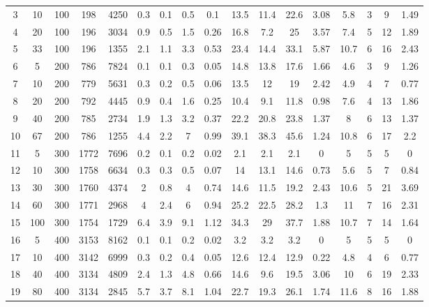 \documentclass[11pt]{article}
\begin{document}
\begin{appendices}
\begin{landscape}
\begin{longtable}[c]{ccccc|cccc|cccc|cccc}
				3 & 10 & 100 & 198 & 4250 & 0.3 & 0.1 & 0.5 & 0.1 & 13.5 & 11.4 & 22.6 & 3.08 & 5.8 & 3 & 9 & 1.49 \\
				\rowcolor[HTML]{EFEFEF} 
				4 & 20 & 100 & 196 & 3034 & 0.9 & 0.5 & 1.5 & 0.26 & 16.8 & 7.2 & 25 & 3.57 & 7.4 & 5 & 12 & 1.89 \\
				\rowcolor[HTML]{EFEFEF} 
				5 & 33 & 100 & 196 & 1355 & 2.1 & 1.1 & 3.3 & 0.53 & 23.4 & 14.4 & 33.1 & 5.87 & 10.7 & 6 & 16 & 2.43 \\
				6 & 5 & 200 & 786 & 7824 & 0.1 & 0.1 & 0.3 & 0.05 & 14.8 & 13.8 & 17.6 & 1.66 & 4.6 & 3 & 9 & 1.26 \\
				7 & 10 & 200 & 779 & 5631 & 0.3 & 0.2 & 0.5 & 0.06 & 13.5 & 12 & 19 & 2.42 & 4.9 & 4 & 7 & 0.77 \\
				8 & 20 & 200 & 792 & 4445 & 0.9 & 0.4 & 1.6 & 0.25 & 10.4 & 9.1 & 11.8 & 0.98 & 7.6 & 4 & 13 & 1.86 \\
				9 & 40 & 200 & 785 & 2734 & 1.9 & 1.3 & 3.2 & 0.37 & 22.2 & 20.8 & 23.8 & 1.37 & 8 & 6 & 13 & 1.37 \\
				10 & 67 & 200 & 786 & 1255 & 4.4 & 2.2 & 7 & 0.99 & 39.1 & 38.3 & 45.6 & 1.24 & 10.8 & 6 & 17 & 2.2 \\
				\rowcolor[HTML]{EFEFEF} 
				11 & 5 & 300 & 1772 & 7696 & 0.2 & 0.1 & 0.2 & 0.02 & 2.1 & 2.1 & 2.1 & 0 & 5 & 5 & 5 & 0 \\
				\rowcolor[HTML]{EFEFEF} 
				12 & 10 & 300 & 1758 & 6634 & 0.3 & 0.3 & 0.5 & 0.07 & 14 & 13.1 & 14.6 & 0.73 & 5.6 & 5 & 7 & 0.84 \\
				\rowcolor[HTML]{EFEFEF} 
				13 & 30 & 300 & 1760 & 4374 & 2 & 0.8 & 4 & 0.74 & 14.6 & 11.5 & 19.2 & 2.43 & 10.6 & 5 & 21 & 3.69 \\
				\rowcolor[HTML]{EFEFEF} 
				14 & 60 & 300 & 1771 & 2968 & 4 & 2.4 & 6 & 0.94 & 25.2 & 22.5 & 28.2 & 1.3 & 11 & 7 & 16 & 2.31 \\
				\rowcolor[HTML]{EFEFEF} 
				15 & 100 & 300 & 1754 & 1729 & 6.4 & 3.9 & 9.1 & 1.12 & 34.3 & 29 & 37.7 & 1.88 & 10.7 & 7 & 14 & 1.64 \\
				16 & 5 & 400 & 3153 & 8162 & 0.1 & 0.1 & 0.2 & 0.02 & 3.2 & 3.2 & 3.2 & 0 & 5 & 5 & 5 & 0 \\
				17 & 10 & 400 & 3142 & 6999 & 0.3 & 0.2 & 0.4 & 0.05 & 12.6 & 12.4 & 12.9 & 0.22 & 4.8 & 4 & 6 & 0.77 \\
				18 & 40 & 400 & 3134 & 4809 & 2.4 & 1.3 & 4.8 & 0.66 & 14.6 & 9.6 & 19.5 & 3.06 & 10 & 6 & 19 & 2.33 \\
				19 & 80 & 400 & 3134 & 2845 & 5.7 & 3.7 & 8.1 & 1.04 & 22.7 & 19.3 & 26.1 & 1.74 & 11.6 & 8 & 16 & 1.88 \\

\end{longtable}
\end{landscape}
\end{appendices}
\end{document}
